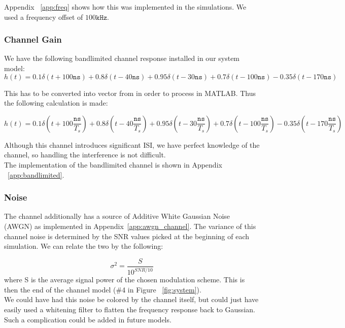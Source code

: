 \documentclass[]{article}
\begin{document}
Appendix ~\ref{app:freq} shows how this was implemented in the simulations.  We used a frequency offset of $100 \mathtt{kHz}$.  



\subsubsection{Channel Gain}
\label{sec:channelFilter}
We  have the following bandlimited channel response installed in our system model:
 $$h(t) = 0.1\delta(t + 100 \mathtt{ns}) + 0.8\delta(t -40 \mathtt{ns}) + 0.95\delta(t - 30 \mathtt{ns}) + 0.7\delta(t - 100 \mathtt{ns}) - 0.35\delta(t - 170 \mathtt{ns})  $$
 
This has to be converted into vector from in order to process in MATLAB. Thus the following calculation is made: 
 
 $$h(t) = 0.1\delta(t + 100 \frac{\mathtt{ns}}{T_s}) + 0.8\delta(t -40 \frac{\mathtt{ns}}{T_s}) + 0.95\delta(t - 30 \frac{\mathtt{ns}}{T_s}) + 0.7\delta(t - 100 \frac{\mathtt{ns}}{T_s}) - 0.35\delta(t - 170 \frac{\mathtt{ns}}{T_s})  $$
 
Although this channel introduces significant ISI, we have perfect knowledge of the channel, so handling the interference is not difficult. \\

The implementation of the bandlimited channel is shown in Appendix ~\ref{app:bandlimited}.

\subsubsection{Noise}
\label{sec:awgn}
The channel additionally has a source of Additive White Gaussian Noise (AWGN) as implemented in Appendix~\ref{app:awgn_channel}. The variance of this channel noise is determined by the SNR values picked at the beginning of each simulation. We can relate the two by the following:

$$\sigma^2 = \frac{S}{10^{SNR/10}}$$
where S is the average signal power of the chosen modulation scheme.  This is then the end of the channel model (\#4 in Figure ~\ref{fig:system}). \\

We could have had this noise be colored by the channel itself, but could just have easily used a whitening filter to flatten the frequency response back to Gaussian.  Such a complication could be added in future models.  
\end{document}
